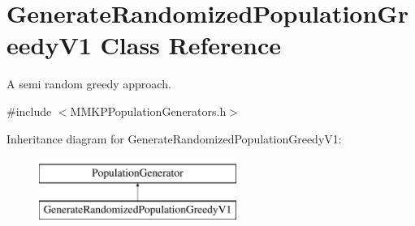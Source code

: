 \hypertarget{class_generate_randomized_population_greedy_v1}{\section{Generate\+Randomized\+Population\+Greedy\+V1 Class Reference}
\label{class_generate_randomized_population_greedy_v1}
}


A semi random greedy approach.  




{\ttfamily \#include $<$M\+M\+K\+P\+Population\+Generators.\+h$>$}

Inheritance diagram for Generate\+Randomized\+Population\+Greedy\+V1\+:\begin{figure}[H]
\begin{center}
\leavevmode
\includegraphics[height=2.000000cm]{class_generate_randomized_population_greedy_v1}
\end{center}
\end{figure}
